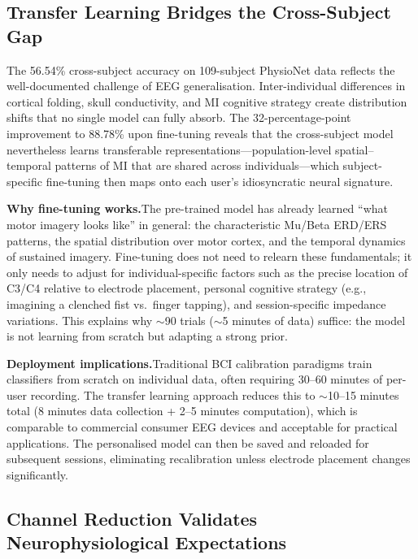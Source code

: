 \documentclass[12pt, a4paper]{article}
\begin{document}
\subsection{Transfer Learning Bridges the Cross-Subject Gap}

The 56.54\% cross-subject accuracy on 109-subject PhysioNet data reflects the well-documented challenge of EEG generalisation. Inter-individual differences in cortical folding, skull conductivity, and MI cognitive strategy create distribution shifts that no single model can fully absorb. The 32-percentage-point improvement to 88.78\% upon fine-tuning reveals that the cross-subject model nevertheless learns transferable representations---population-level spatial--temporal patterns of MI that are shared across individuals---which subject-specific fine-tuning then maps onto each user's idiosyncratic neural signature.

\textbf{Why fine-tuning works.}\quad The pre-trained model has already learned ``what motor imagery looks like'' in general: the characteristic Mu/Beta ERD/ERS patterns, the spatial distribution over motor cortex, and the temporal dynamics of sustained imagery. Fine-tuning does not need to relearn these fundamentals; it only needs to adjust for individual-specific factors such as the precise location of C3/C4 relative to electrode placement, personal cognitive strategy (e.g., imagining a clenched fist vs.\ finger tapping), and session-specific impedance variations. This explains why $\sim$90 trials ($\sim$5 minutes of data) suffice: the model is not learning from scratch but adapting a strong prior.

\textbf{Deployment implications.}\quad Traditional BCI calibration paradigms train classifiers from scratch on individual data, often requiring 30--60 minutes of per-user recording. The transfer learning approach reduces this to $\sim$10--15 minutes total (8 minutes data collection + 2--5 minutes computation), which is comparable to commercial consumer EEG devices and acceptable for practical applications. The personalised model can then be saved and reloaded for subsequent sessions, eliminating recalibration unless electrode placement changes significantly.

\subsection{Channel Reduction Validates Neurophysiological Expectations}
\end{document}
